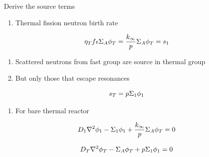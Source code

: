 \documentclass[aspectratio=1610,pdftex,dvipsnames,compress,xcolor={dvipsnames}]{beamer}
\begin{document}
\begin{frame}{Derive the source terms}
    \begin{enumerate}[series=outerlist,topsep=0pt,itemsep=11pt,leftmargin=*,label=(\arabic*)]
        \item[]Thermal fission neutron birth rate
    \end{enumerate}

    \vspace*{\fill}

    \begin{equation}
        \LARGE
        \eta_T f \epsilon \Sigma_A \phi_T  = \frac{k_\infty}{p} \Sigma_A \phi_T = s_1
    \end{equation}

    \vspace*{\fill}

    \begin{enumerate}[series=outerlist,topsep=0pt,itemsep=11pt,leftmargin=*,label=(\arabic*)]
        \item[]Scattered neutrons from fast group are source in thermal group
        \item[]But only those that escape resonances
    \end{enumerate}

    \vspace*{\fill}

    \begin{equation}
        \LARGE
        s_T = p \Sigma_1 \phi_1
    \end{equation}

    \vspace*{\fill}

    \begin{enumerate}[series=outerlist,topsep=0pt,itemsep=11pt,leftmargin=*,label=(\arabic*)]
        \item[]For bare thermal reactor
    \end{enumerate}
\end{frame}


\begin{frame}{}
    \begin{equation}
        \LARGE
        D_1 \nabla^2 \phi_1 - \Sigma_1 \phi_1 + \frac{k_\infty}{p} \Sigma_A \phi_T = 0
    \end{equation}

    \begin{equation}
        \LARGE
        D_T \nabla^2 \phi_T - \Sigma_A \phi_T + p \Sigma_1 \phi_1 = 0
    \end{equation}
\end{frame}
\end{document}
